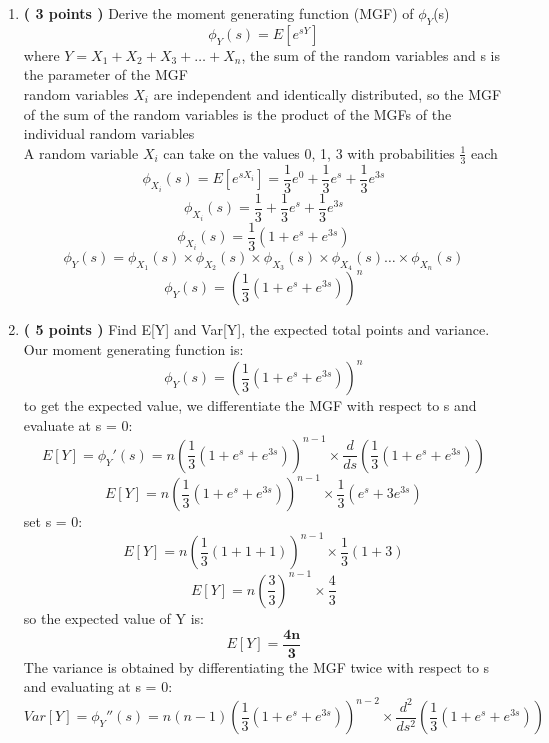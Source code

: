 \documentclass[a3paper,12pt]{extarticle} %
\begin{document}
    \begin{enumerate}
        \item \textbf{( 3 points )} Derive the moment generating function (MGF) of \(\phi_Y\)(s)
        \[
        \phi_{Y}(s) = E[e^{sY}]
        \]
        where \(Y = X_1 + X_2 + X_3 + \dots + X_n\), the sum of the random variables and s is the parameter of the MGF
        \\ random variables \(X_i\) are independent and identically distributed, so the MGF of the sum of the random variables is the product of the MGFs of the individual random variables
        \\ A random variable \(X_i\) can take on the values 0, 1, 3 with probabilities \(\frac{1}{3}\) each 
        \[
        \phi_{X_i}(s) = E[e^{sX_i}] = \frac{1}{3}e^{0} + \frac{1}{3}e^{s} + \frac{1}{3}e^{3s}
        \]
        \[
        \phi_{X_i}(s) = \frac{1}{3} + \frac{1}{3}e^{s} + \frac{1}{3}e^{3s}
        \]
        \[
        \phi_{X_i}(s) = \frac{1}{3}(1 + e^{s} + e^{3s})
        \]
        \[
        \phi_{Y}(s) = \phi_{X_1}(s) \times \phi_{X_2}(s) \times \phi_{X_3}(s) \times \phi_{X_4}(s) \dots \times \phi_{X_n}(s)
        \]
        \[
        \phi_{Y}(s) = \left(\frac{1}{3}(1 + e^{s} + e^{3s})\right)^n
        \]
        \item \textbf{( 5 points )} Find E[Y] and Var[Y], the expected total points and variance.
        \\ Our moment generating function is:
        \[
        \phi_{Y}(s) = \left(\frac{1}{3}(1 + e^{s} + e^{3s})\right)^n
        \]
        to get the expected value, we differentiate the MGF with respect to s and evaluate at s = 0:
        \[
        E[Y] = \phi_{Y}'(s) = n\left(\frac{1}{3}(1 + e^{s} + e^{3s})\right)^{n-1} \times \frac{d}{ds}\left(\frac{1}{3}(1 + e^{s} + e^{3s})\right)
        \]
        \[
        E[Y] = n\left(\frac{1}{3}(1 + e^{s} + e^{3s})\right)^{n-1} \times \frac{1}{3}(e^{s} + 3e^{3s})
        \]
        set s = 0:
        \[
        E[Y] = n\left(\frac{1}{3}(1 + 1 + 1)\right)^{n-1} \times \frac{1}{3}(1 + 3)
        \]
        \[
        E[Y] = n\left(\frac{3}{3}\right)^{n-1} \times \frac{4}{3}
        \]
        so the expected value of Y is:
        \[
        E[Y] = \mathbf{\frac{4n}{3}}
        \]
        The variance is obtained by differentiating the MGF twice with respect to s and evaluating at s = 0:
        \[
        Var[Y] = \phi_{Y}''(s) = n(n-1)\left(\frac{1}{3}(1 + e^{s} + e^{3s})\right)^{n-2} \times \frac{d^2}{ds^2}\left(\frac{1}{3}(1 + e^{s} + e^{3s})\right)
        \]
        \[
\]
\end{enumerate}
\end{document}
